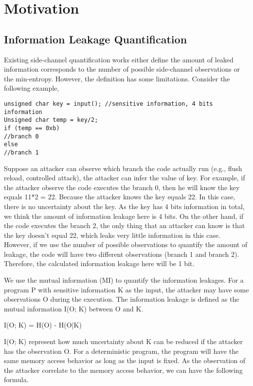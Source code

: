 \section{Motivation}
\subsection{Information Leakage Quantification}
Existing side-channel quantification works either define the amount of leaked information corresponds to the number of possible side-channel observations or the min-entropy. However, the definition has some limitations. Consider the following example,

\begin{lstlisting}
unsigned char key = input(); //sensitive information, 4 bits information 
Unsigned char temp = key/2;
if (temp == 0xb)
//branch 0
else
//branch 1
\end{lstlisting}

Suppose an attacker can observe which branch the code actually run (e.g., flush reload, controlled attack), the attacker can infer the value of key. For example, if the attacker observe the code executes the branch 0, then he will know the key equals 11*2 = 22. Because the attacker knows the key equals 22. In this case, there is no uncertainty about the key. As the key has 4 bits information in total, we think the amount of information leakage here is 4 bits. On the other hand, if the code executes the branch 2, the only thing that an attacker can know is that the key doesn’t equal 22, which leaks very little information in this case.  However, if we use the number of possible observations to quantify the amount of leakage, the code will have two different observations (branch 1 and branch 2). Therefore, the calculated information leakage here will be 1 bit. 

We use the mutual information (MI) to quantify the information leakages. For a program P with sensitive information K as the input, the attacker may have some observations O during the execution. The information leakage is defined as the mutual information I(O; K) between O and K.

I(O; K) = H(O) - H(O|K)

I(O; K) represent how much uncertainty about K can be reduced if the attacker has the observation O.
For a deterministic program, the program will have the same memory access behavior as long as the input is fixed. As the observation of the attacker correlate to the memory access behavior, 
we can have the following formula.

